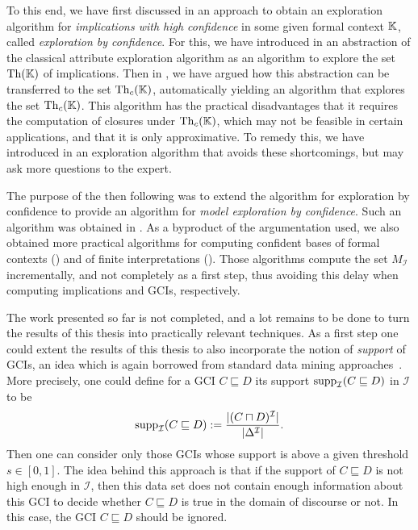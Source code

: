 To this end, we have first discussed in  an approach to obtain an
exploration algorithm for \emph{implications with high confidence} in some given formal
context ${\mathbb{K}}$, called \emph{exploration by confidence}.  For this, we have introduced
in  an abstraction of the classical attribute exploration
algorithm as an algorithm to explore the set $\operatorname{Th}({\mathbb{K}})$ of implications.  Then in
, we have argued how this abstraction can be transferred to the set
$\operatorname{Th}_{c}({\mathbb{K}})$, automatically yielding an algorithm that explores the set $\operatorname{Th}_{c}({\mathbb{K}})$.  This algorithm has the practical disadvantages that it requires the computation of
closures under $\operatorname{Th}_{c}({\mathbb{K}})$, which may not be feasible in certain applications, and
that it is only approximative.  To remedy this, we have introduced in
 an exploration algorithm that avoids these shortcomings, but may
ask more questions to the expert.

The purpose of the then following  was to extend the algorithm
for exploration by confidence to provide an algorithm for \emph{model exploration by
  confidence}.  Such an algorithm was obtained in .  As a
byproduct of the argumentation used, we also obtained more practical algorithms for
computing confident bases of formal contexts () and of finite
interpretations ().  Those algorithms compute the set
$M_{\mathcal{I}}$ incrementally, and not completely as a first step, thus avoiding this
delay when computing implications and GCIs, respectively.

The work presented so far is not completed, and a lot remains to be done to turn the
results of this thesis into practically relevant techniques.  As a first step one could
extent the results of this thesis to also incorporate the notion of \emph{support} of
GCIs, an idea which is again borrowed from standard data mining
approaches~\cite{arules:agrawal:association-rules}.  More precisely, one could define for
a GCI $C \sqsubseteq D$ its support $\operatorname{supp}_{\mathcal{I}}(C \sqsubseteq D)$ in
$\mathcal{I}$ to be
\begin{equation*}
  \operatorname{supp}_{\mathcal{I}}( C \sqsubseteq D ) := \frac{ \lvert(C \sqcap D)^{\mathcal{I}}\rvert }{
    \lvert \Delta^{\mathcal{I}} \rvert }.
\end{equation*}
Then one can consider only those GCIs whose support is above a given threshold $s \in
[0,1]$.  The idea behind this approach is that if the support of $C \sqsubseteq D$ is not
high enough in $\mathcal{I}$, then this data set does not contain enough information about
this GCI to decide whether $C \sqsubseteq D$ is true in the domain of discourse or not.
In this case, the GCI $C \sqsubseteq D$ should be ignored.

